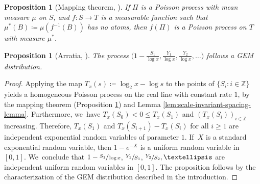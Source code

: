 \documentclass[10pt,a4paper]{article}
\newcommand{\ZZ}{\mathbb{Z}}
\newcommand{\bg}{\big}
\theoremstyle{plain}
\newtheorem{prop}[cor]{Proposition}
\theoremstyle{definition}
\begin{document}
\begin{prop}[Mapping theorem, {\cite[\S2.3]{Kingman93}}]
\label{prel:map}
If $\Pi$ is a Poisson process with mean measure $\mu$ on $S$, and $f:S \to T$ is a measurable function such that $\mu^*(B) \coloneqq \mu(f^{-1}(B))$ has no atoms, then $f(\Pi)$ is a Poisson process on $T$ with measure $\mu^*$.
\end{prop}

\begin{prop}[Arratia, \cite{Arratia02}]
\label{prop:gemfrompi}
The process $\bg(1-\frac{S_1}{\log x}, \frac{Y_1}{\log x}, \frac{Y_2}{\log x}, \ldots\bg)$ follows a GEM distribution.
\end{prop}

\begin{proof}
Applying the map $T_x(s) \coloneqq \log_2 x - \log s$ to the points of \hbox{$\{S_i : i \in \ZZ\}$} yields a homogeneous Poisson process on the real line with constant rate $1$, by the mapping theorem (Proposition \ref{prel:map}) and Lemma \ref{lem:scale-invariant-spacing-lemma}. Furthermore, we~have \hbox{$T_x(S_0) \!<\! 0 \!\le\! T_x(S_1)$} and $(T_x(S_i))_{i \in \ZZ}$ increasing. Therefore, $T_x(S_1)$ and \hbox{$T_x(S_{i+1}) \!-\! T_x(S_i)$} for all $i \ge 1$ are independent exponential random variables of parameter $1$. If~$X$ is a standard exponential random variable, then $1-e^{-X}$ is a uniform random variable in $[0, 1]$. We~conclude that $1-\sfrac{S_1}{\log x}$, $\sfrac{Y_1}{S_1}$, $\sfrac{Y_2}{S_2},\dots$ are independent uniform random variables in $[0, 1]$. The proposition follows by the characterization of the GEM distribution described in the introduction.
\end{proof}
\end{document}
